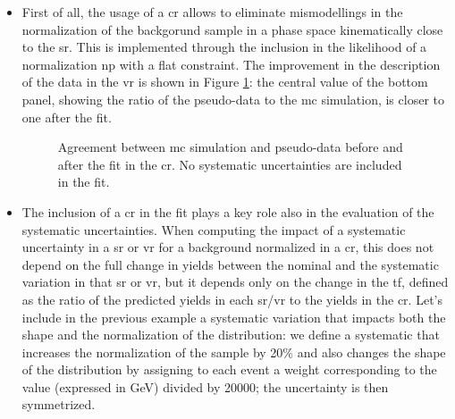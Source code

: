 \begin{itemize}
\item First of all, the usage of a \gls{cr} allows to eliminate mismodellings in the normalization of the backgorund sample in a phase space 
kinematically close to the \gls{sr}. This is implemented through the inclusion in the likelihood of a normalization \gls{np} with a flat constraint.
The improvement in the description of the data in the \gls{vr} is shown in Figure \ref{fig:stat:VRclosure}: the central value of the bottom panel,
showing the ratio of the pseudo-data to the \gls{mc} simulation, is closer to one after the fit.

\begin{figure}[h]
\centering 
{}
\caption{
Agreement between \gls{mc} simulation and pseudo-data  before and  after the fit in the \gls{cr}. No systematic uncertainties are included in the fit. 
}
\label{fig:stat:VRclosure}
\end{figure}

\item The inclusion of a \gls{cr} in the fit plays a key role also in the evaluation of the systematic uncertainties. 
When computing the impact of a systematic uncertainty in a \gls{sr} or \gls{vr} for a background normalized in a \gls{cr}, 
this does not depend on the full change in yields between the nominal and the systematic variation in that \gls{sr} or \gls{vr},
but it depends only on the change in the \gls{tf}, defined as the ratio of the predicted yields in each \gls{sr}/\gls{vr} to the yields in the \gls{cr}. 
Let's include in the previous example a systematic variation that impacts both the shape and the normalization of the \meff distribution: 
we define a systematic that increases the normalization of the sample by 20\% and also changes the shape of the \meff distribution by 
assigning to each event a weight corresponding to the \meff value (expressed in GeV) divided by 20000; the uncertainty is then symmetrized. 


\end{itemize}
